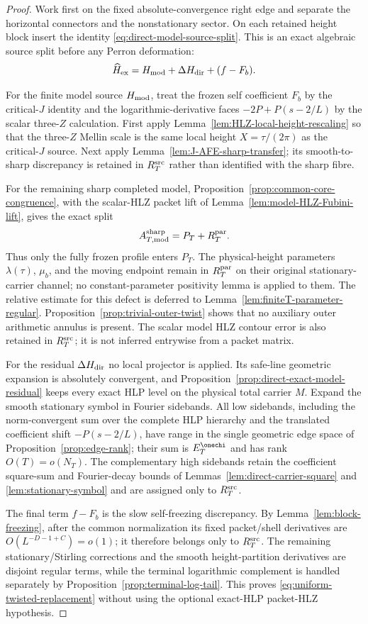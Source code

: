 \begin{proof}
Work first on the fixed absolute-convergence right edge and separate the
horizontal connectors and the nonstationary sector.  On each retained height
block insert the identity \eqref{eq:direct-model-source-split}.  This is an
exact algebraic source split before any Perron deformation:
\[
\widehat H_{\rm ex}
=H_{\rm mod}+\Delta H_{\rm dir}+(f-F_b).
\]

For the finite model source $H_{\rm mod}$, treat the frozen self coefficient
$F_b$ by the critical-$J$ identity and the logarithmic-derivative faces
$-2P+P(s-2/L)$ by the scalar three-$Z$ calculation.  First apply
Lemma~\ref{lem:HLZ-local-height-rescaling} so that the three-$Z$ Mellin scale is
the same local height $X=\tau/(2\pi)$ as the critical-$J$ source.  Next apply
Lemma~\ref{lem:J-AFE-sharp-transfer}; its smooth-to-sharp discrepancy is retained
in $R_T^{\rm src}$ rather than identified with the sharp fibre.

For the remaining sharp completed model,
Proposition~\ref{prop:common-core-congruence}, with the scalar-HLZ packet lift
of Lemma~\ref{lem:model-HLZ-Fubini-lift}, gives the exact split
\[
A_{T,\rm mod}^{\rm sharp}=P_T+R_T^{\rm par}.
\]
Thus only the fully frozen profile enters $P_T$.  The physical-height parameters
$\lambda(\tau)$, $\mu_b$, and the moving endpoint remain in
$R_T^{\rm par}$ on their original stationary-carrier channel; no
constant-parameter positivity lemma is applied to them.  The relative estimate
for this defect is deferred to Lemma~\ref{lem:finiteT-parameter-regular}.
Proposition~\ref{prop:trivial-outer-twist} shows that no auxiliary outer
arithmetic annulus is present.  The scalar model HLZ contour error is also
retained in $R_T^{\rm src}$; it is not inferred entrywise from a packet matrix.

For the residual $\Delta H_{\rm dir}$ no local projector is applied.  Its safe-line
geometric expansion is absolutely convergent, and
Proposition~\ref{prop:direct-exact-model-residual} keeps every exact HLP level
on the physical total carrier $M$.  Expand the smooth stationary symbol in
Fourier sidebands.  All low sidebands, including the norm-convergent sum over
the complete HLP hierarchy and the translated coefficient shift
$-P(s-2/L)$, have range in the single geometric edge space of
Proposition~\ref{prop:edge-rank}; their sum is $E_T^{\onechi}$ and has rank
$O(T)=o(N_T)$.  The complementary high sidebands retain the coefficient
square-sum and Fourier-decay bounds of
Lemmas~\ref{lem:direct-carrier-square} and \ref{lem:stationary-symbol} and are
assigned only to $R_T^{\rm src}$.

The final term $f-F_b$ is the slow self-freezing discrepancy.  By
Lemma~\ref{lem:block-freezing}, after the common normalization its fixed
packet/shell derivatives are $O(L^{-D-1+C})=o(1)$; it therefore belongs only to
$R_T^{\rm src}$.  The remaining stationary/Stirling corrections and the
smooth height-partition derivatives are disjoint regular terms, while the
terminal logarithmic complement is handled separately by
Proposition~\ref{prop:terminal-log-tail}.  This proves
\eqref{eq:uniform-twisted-replacement} without using the optional exact-HLP
packet-HLZ hypothesis.
\end{proof}
